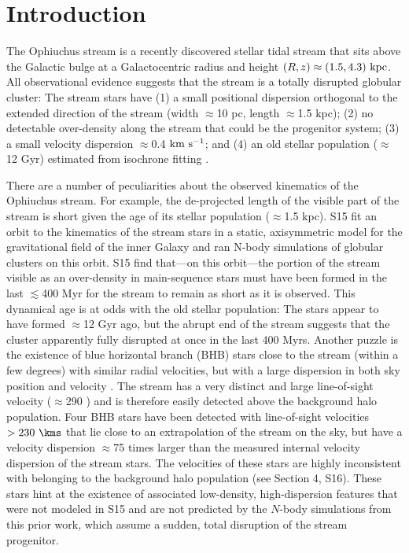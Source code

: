 \documentclass[numberedappendix]{emulateapj}
\begin{document}

\section{Introduction}\label{sec:introduction}

The Ophiuchus stream \citep{bernard14, sesar15a} is a recently discovered stellar tidal stream that sits above the Galactic bulge at a Galactocentric radius and height $(R,z) \approx (1.5, 4.3)~{\rm kpc}$. All observational evidence suggests that the stream is a totally disrupted globular cluster: The stream stars have (1) a small positional dispersion orthogonal to the extended direction of the stream (width $\approx$10 pc, length $\approx$1.5 kpc); (2) no detectable over-density along the stream that could be the progenitor system; (3) a small velocity dispersion $\approx$0.4 ${\rm km}~{\rm s}^{-1}$; and (4) an old stellar population ($\approx$12 Gyr) estimated from isochrone fitting \citep[][hereafter S15]{sesar15a}. 

There are a number of peculiarities about the observed kinematics of the Ophiuchus stream. For example, the de-projected length of the visible part of the stream is short given the age of its stellar population ($\approx$1.5 kpc). S15 fit an orbit to the kinematics of the stream stars in a static, axisymmetric model for the gravitational field of the inner Galaxy and ran N-body simulations of globular clusters on this orbit. S15 find that---on this orbit---the portion of the stream visible as an over-density in main-sequence stars must have been formed in the last $\lesssim$400 Myr for the stream to remain as short as it is observed. This dynamical age is at odds with the old stellar population: The stars appear to have formed $\approx$12 Gyr ago, but the abrupt end of the stream suggests that the cluster apparently fully disrupted at once in the last 400 Myrs. Another puzzle is the existence of blue horizontal branch (BHB) stars close to the stream (within a few degrees) with similar radial velocities, but with a large dispersion in both sky position and velocity \citep[][hereafter S16]{sesar16}. The stream has a very distinct and large line-of-sight velocity ($\approx$290 \kms) and is therefore easily detected above the background halo population. Four BHB stars have been detected with line-of-sight velocities $>230~\kms$ that lie close to an extrapolation of the stream on the sky, but have a velocity dispersion $\approx$75 times larger than the measured internal velocity dispersion of the stream stars. The velocities of these stars are highly inconsistent with belonging to the background halo population (see Section 4, S16). These stars hint at the existence of associated low-density, high-dispersion features that were not modeled in S15 and are not predicted by the $N$-body simulations from this prior work, which assume a sudden, total disruption of the stream progenitor.
\end{document}
